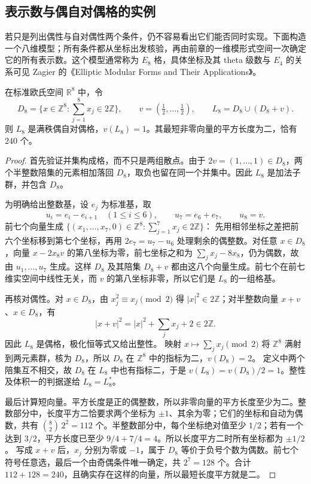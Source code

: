 \subsection{表示数与偶自对偶格的实例}
\label{b3:subsec:240504}

若只是列出偶性与自对偶性两个条件，仍不容易看出它们能否同时实现。下面构造一个八维模型；所有条件都从坐标出发核验，再由前章的一维模形式空间一次确定它的所有表示数。这个模型通常称为 \(E_8\) 格，具体坐标及其 theta 级数与 \(E_4\) 的关系可见 Zagier 的《Elliptic Modular Forms and Their Applications》\cite[p. 34]{Zagier2008Elliptic}。

\begin{proposition}[八维偶自对偶格]\label{b3:prop:24-e8-lattice}
在标准欧氏空间 \(\mathbb R^8\) 中，令
\[
 D_8=\{x\in\mathbb Z^8:\textstyle\sum_{j=1}^8x_j\in2\mathbb Z\},
 \qquad v=\left(\tfrac12,\ldots,\tfrac12\right),\qquad
 L_8=D_8\cup(D_8+v).
\]
则 \(L_8\) 是满秩偶自对偶格，\(v(L_8)=1\)。其最短非零向量的平方长度为二，恰有 \(240\) 个。
\end{proposition}
\begin{proof}
首先验证并集构成格，而不只是两组散点。由于 \(2v=(1,\ldots,1)\in D_8\)，两个半整数陪集的元素相加落回 \(D_8\)，取负也留在同一个并集中。因此 \(L_8\) 是加法子群，并包含 \(D_8\)。

为明确给出整数基，设 \(e_j\) 为标准基，取
\[
 u_i=e_i-e_{i+1}\quad(1\le i\le6),\qquad
 u_7=e_6+e_7,\qquad u_8=v.
\]
前七个向量生成
\(\{(x_1,\ldots,x_7,0)\in\mathbb Z^8:\sum_{j=1}^7x_j\in2\mathbb Z\}\)：
先用相邻坐标之差把前六个坐标移到第七个坐标，再用
\(2e_7=u_7-u_6\) 处理剩余的偶整数。对任意 \(x\in D_8\)，向量
\(x-2x_8v\) 的第八坐标为零，前七坐标之和为
\(\sum_jx_j-8x_8\)，仍为偶数，故由 \(u_1,\ldots,u_7\) 生成。这样 \(D_8\) 及其陪集 \(D_8+v\) 都由这八个向量生成。前七个在前七维实空间中线性无关，而 \(v\) 的第八坐标非零，所以它们是 \(L_8\) 的一组格基。

再核对偶性。对 \(x\in D_8\)，由 \(x_j^2\equiv x_j\pmod2\) 得
\(|x|^2\in2\mathbb Z\)；对半整数向量 \(x+v\)、\(x\in D_8\)，有
\[
 |x+v|^2=|x|^2+\sum_jx_j+2\in2\mathbb Z.
\]
因此 \(L_8\) 是偶格，极化恒等式又给出整性。
映射 \(x\mapsto\sum_jx_j\pmod2\) 将 \(\mathbb Z^8\) 满射到两元素群，核为 \(D_8\)，所以 \(D_8\) 在 \(\mathbb Z^8\) 中的指标为二，\(v(D_8)=2\)。
定义中两个陪集互不相交，故 \(D_8\) 在 \(L_8\) 中也有指标二，于是
\(v(L_8)=v(D_8)/2=1\)。整性及体积一的判据遂给 \(L_8=L_8^*\)。

最后计算短向量。平方长度是正的偶整数，所以非零向量的平方长度至少为二。整数部分中，长度平方二恰要求两个坐标为 \(\pm1\)、其余为零；它们的坐标和自动为偶数，共有
\(\binom82\,2^2=112\) 个。半整数部分中，每个坐标绝对值至少 \(1/2\)；若有一个达到 \(3/2\)，平方长度已至少
\(9/4+7/4=4\)。所以长度平方二时所有坐标都为 \(\pm1/2\)。
写成 \(x+v\) 后，\(x_j\) 分别为零或 \(-1\)，属于 \(D_8\) 等价于负号个数为偶数。前七个符号任意选，最后一个由奇偶条件唯一确定，共 \(2^7=128\) 个。合计 \(112+128=240\)，且确实存在这样的向量，所以最短长度平方就是二。
\end{proof}

